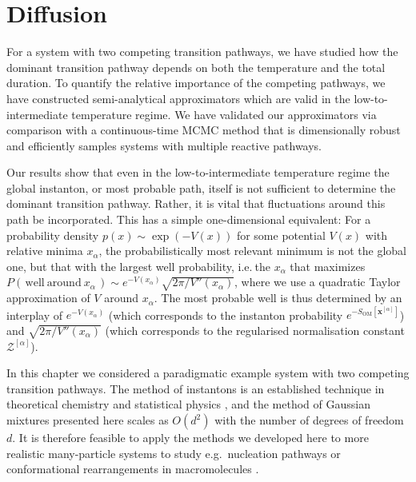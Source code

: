 \documentclass[]{cam-thesis}
\begin{document}
\section{Diffusion}


For a system with two competing transition pathways,
we have studied how the dominant transition pathway depends on both
the temperature and the total duration. To quantify the relative importance
of the competing pathways, we have constructed semi-analytical approximators
which are valid in the low-to-intermediate temperature regime. We
have validated our approximators via comparison with a continuous-time
MCMC method that is dimensionally robust and efficiently samples systems
with multiple reactive pathways.

Our results show that even in the low-to-intermediate temperature
regime the global instanton, or most probable path, itself is not
sufficient to determine the dominant transition pathway. Rather, it
is vital that fluctuations around this path be incorporated. This
has a simple one-dimensional equivalent: For a probability density
$p(x)\sim\exp(-V(x))$ for some potential $V(x)$ with relative
minima $x_{\alpha}$, the probabilistically most relevant minimum
is not the global one, but that with the largest well probability,
i.e.$~$the $x_{\alpha}$ that maximizes $P(\,\mathrm{well~around~}x_{\alpha}\,)\sim e^{-V(x_{\alpha})}\sqrt{{2\pi}/{V''(x_{\alpha})}}$,
where we use a quadratic Taylor approximation of $V$ around $x_{\alpha}$.
The most probable well is thus determined by an interplay of $e^{-V(x_{\alpha})}$
(which corresponds to the instanton probability $e^{-S_{\text{OM}}[\mathbf{x}^{[\alpha]}]}$)
and $\sqrt{{2\pi}/{V''(x_{\alpha})}}$ (which corresponds to the regularised
normalisation constant $\mathcal{Z}^{[\alpha]}$).

In this chapter we considered a paradigmatic example system with
two competing transition pathways. The method of instantons is an
established technique in theoretical chemistry and statistical physics
\citep{eMinimumActionMethod2004a, weinanStringMethodStudy2002, grafke_instanton_2015, grafke_numerical_2019, schorlepp_gelfandyaglom_2021, dematteis_experimental_2019, ferreApproximateOptimalControls2021a, kikuchiRitzMethodTransition2020a, heymannGeometricMinimumAction2008a},
and the method of Gaussian mixtures presented here scales as $O(d^{2})$
with the number of degrees of freedom $d$. It is
therefore feasible to apply the methods we developed here to more
realistic many-particle systems to study e.g.~nucleation pathways
\citep{weinanStringMethodStudy2002, lutskoHowCrystalsForm2019a, rein_ten_wolde_numerical_1996}
or conformational rearrangements in macromolecules \citep{ren_transition_2005, fujisakiOnsagerMachlupActionbased2010a, fujisakiMultiscaleEnhancedPath2013a, gartnerModelingSimulationsPolymers2019}.
\end{document}
